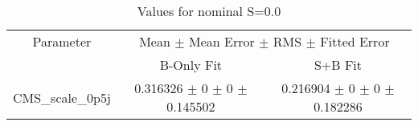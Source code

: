 \begin{table}
\centering
\caption{Values for nominal S=0.0}
\begin{tabular}{ccc}
\toprule
Parameter & \multicolumn{2}{c}{Mean $\pm$ Mean Error $\pm$ RMS $\pm$ Fitted Error}\\
 & B-Only Fit & S+B Fit\\
\midrule
CMS\_scale\_0p5j & \num{0.316326} $\pm$ \num{0} $\pm$ \num{0} $\pm$ \num{0.145502} & \num{0.216904} $\pm$ \num{0} $\pm$ \num{0} $\pm$ \num{0.182286}\\
\bottomrule
\end{tabular}
\end{table}